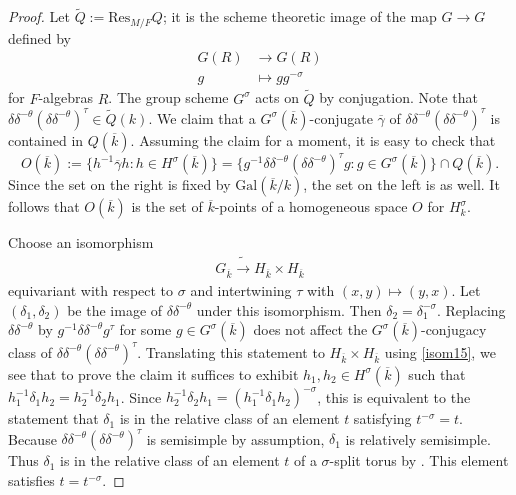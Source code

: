 \documentclass[12pt]{amsart}
\theoremstyle{remark}
\numberwithin{equation}{section}
\newcommand{\Gal}{\mathrm{Gal}}
\newcommand{\lto}{\longrightarrow}
\theoremstyle{definition}
\renewcommand{\bar}{\overline}
\numberwithin{equation}{subsection}
\begin{document}
\begin{proof}
Let $\widetilde{Q}:=\mathrm{Res}_{M/F} Q$; it is the scheme theoretic image of the map $G \lto G$ defined by
\begin{align*}
G(R) &\lto G(R)\\
g &\longmapsto gg^{-\sigma}
\end{align*}
for $F$-algebras $R$.   The group scheme $G^{\sigma}$ acts on $\widetilde{Q}$ by conjugation.
Note that $\delta \delta^{-\theta}(\delta\delta^{-\theta})^{\tau} \in \widetilde{Q}(k)$.  We claim that a $G^{\sigma}(\bar{k})$-conjugate $\bar{\gamma}$ of $\delta \delta^{-\theta}(\delta \delta^{-\theta})^{\tau}$ is contained in $Q(\bar{k})$.
Assuming the claim for a moment, it is easy to check that
$$
O(\bar{k}):=\{h^{-1}\bar{\gamma}h:h \in H^{\sigma}(\bar{k})\}=\{g^{-1} \delta \delta^{-\theta}(\delta \delta^{-\theta})^{\tau}g :g \in G^{\sigma}(\bar{k})\} \cap Q(\bar{k}).
$$
Since the set on the right is fixed by $\Gal(\bar{k}/k)$, the set on the left is as well.  It follows that $O(\bar{k})$ is the set of $\bar{k}$-points of a homogeneous space $O$ for $H^{\sigma}_k$.

Choose an isomorphism
\begin{align} \label{isom15}
G_{\bar{k}} \tilde{\lto} H_{\bar{k}} \times H_{\bar{k}}
\end{align}
 equivariant with respect to $\sigma$ and intertwining $\tau$ with $(x,y) \mapsto (y,x)$.  Let $(\delta_1,\delta_2)$ be the image of $\delta \delta^{-\theta}$ under this isomorphism.  Then $\delta_2=\delta_1^{-\sigma}$.  Replacing $\delta\delta^{-\theta}$ by $g^{-1}\delta \delta^{-\theta}g^{\tau}$ for some $g \in G^{\sigma}(\bar{k})$ does not affect the $G^{\sigma}(\bar{k})$-conjugacy class of $\delta \delta^{-\theta}(\delta \delta^{-\theta})^{\tau}$.  Translating this statement to $H_{\bar{k}} \times H_{\bar{k}}$ using \eqref{isom15}, we see that to prove the claim it suffices to exhibit $h_1,h_2 \in H^{\sigma}(\bar{k})$
such that $h_1^{-1}\delta_1h_2=h_2^{-1}\delta_2h_1$.  Since $h_2^{-1} \delta_2h_1=(h_1^{-1}\delta_1h_2)^{-\sigma}$, this is equivalent to the statement that $\delta_1$ is in the relative class of an element $t$ satisfying $t^{-\sigma}=t$.  Because $\delta \delta^{-\theta}(\delta \delta^{-\theta})^{\tau}$ is semisimple by assumption, $\delta_1$ is relatively semisimple.  Thus $\delta_1$ is in the relative class of an element $t$ of a $\sigma$-split torus by
\cite[Theorem 7.5]{Rich}.  This element satisfies $t=t^{-\sigma}$.
\end{proof}
\end{document}
